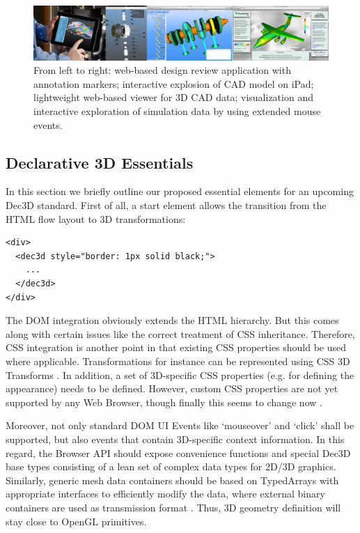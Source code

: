 \documentclass{acmsiggraph}
\begin{document}
\begin{figure}
  \centering
  \includegraphics[width=1.0\textwidth]{images/cad_apps.png}
  \caption{From left to right: web-based design review application with annotation markers; interactive explosion of CAD model on iPad; lightweight web-based viewer for 3D CAD data; visualization and interactive exploration of simulation data by using extended mouse events.}
  \label{fig:cadApps}
  \vspace{-0.2cm}
\end{figure}


\subsection{Declarative 3D Essentials}

In this section we briefly outline our proposed essential elements for an upcoming Dec3D standard. First of all, a start element allows the transition from the HTML flow layout to 3D transformations:

\small
\begin{verbatim}
<div>
  <dec3d style="border: 1px solid black;">
    ...
  </dec3d>
</div>
\end{verbatim}
\normalsize

The DOM integration obviously extends the HTML hierarchy. But this comes along with certain issues like the correct treatment of CSS inheritance. Therefore, CSS integration is another point in that existing CSS properties should be used where applicable. Transformations for instance can be represented using CSS 3D Transforms \cite{webkit3DCSS}. In addition, a set of 3D-specific CSS properties (e.g. for defining the appearance) needs to be defined. However, custom CSS properties are not yet supported by any Web Browser, though finally this seems to change now \cite{CSSCustom}.

Moreover, not only standard DOM UI Events like `mouseover' and `click' shall be supported, but also events that contain 3D-specific context information.
In this regard, the Browser API should expose convenience functions and special Dec3D base types consisting of a lean set of complex data types for 2D/3D graphics. Similarly, generic mesh data containers should be based on TypedArrays \cite{TypArr12} with appropriate interfaces to efficiently modify the data, where external binary containers are used as transmission format \cite{Behr12,Trevett12}. Thus, 3D geometry definition will stay close to OpenGL primitives.
\end{document}
